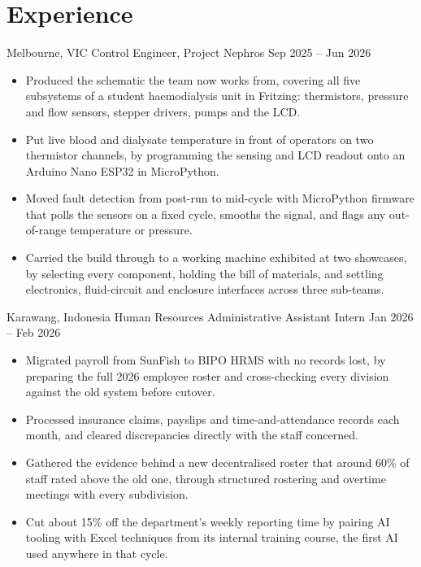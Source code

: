 \section*{Experience}

{Melbourne, VIC}
{Control Engineer, Project Nephros}
{Sep 2025 -- Jun 2026}
{
\begin{itemize}
    \item Produced the schematic the team now works from, covering all five subsystems of a student haemodialysis unit in Fritzing: thermistors, pressure and flow sensors, stepper drivers, pumps and the LCD.
    \item Put live blood and dialysate temperature in front of operators on two thermistor channels, by programming the sensing and LCD readout onto an Arduino Nano ESP32 in MicroPython.
    \item Moved fault detection from post-run to mid-cycle with MicroPython firmware that polls the sensors on a fixed cycle, smooths the signal, and flags any out-of-range temperature or pressure.
    \item Carried the build through to a working machine exhibited at two showcases, by selecting every component, holding the bill of materials, and settling electronics, fluid-circuit and enclosure interfaces across three sub-teams.
\end{itemize}
}

{Karawang, Indonesia}
{Human Resources Administrative Assistant Intern}
{Jan 2026 -- Feb 2026}
{
\begin{itemize}
    \item Migrated payroll from SunFish to BIPO HRMS with no records lost, by preparing the full 2026 employee roster and cross-checking every division against the old system before cutover.
    \item Processed insurance claims, payslips and time-and-attendance records each month, and cleared discrepancies directly with the staff concerned.
    \item Gathered the evidence behind a new decentralised roster that around 60\% of staff rated above the old one, through structured rostering and overtime meetings with every subdivision.
    \item Cut about 15\% off the department's weekly reporting time by pairing AI tooling with Excel techniques from its internal training course, the first AI used anywhere in that cycle.
\end{itemize}
}


